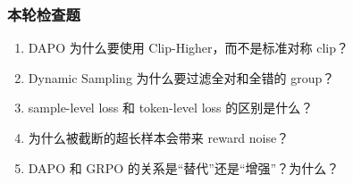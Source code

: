 \subsubsection{本轮检查题}

\begin{enumerate}[leftmargin=1.5em]
  \item DAPO 为什么要使用 Clip-Higher，而不是标准对称 clip？
  \item Dynamic Sampling 为什么要过滤全对和全错的 group？
  \item sample-level loss 和 token-level loss 的区别是什么？
  \item 为什么被截断的超长样本会带来 reward noise？
  \item DAPO 和 GRPO 的关系是“替代”还是“增强”？为什么？
\end{enumerate}
